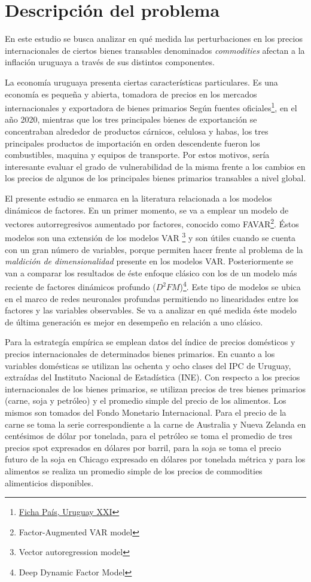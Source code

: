 \chapter{Descripción del problema}\label{chap:intro}

En este estudio se busca analizar en qué medida las perturbaciones en los precios internacionales de ciertos bienes transables denominados \textit{commodities} afectan a la inflación uruguaya a través de sus distintos componentes. 

La economía uruguaya presenta ciertas características particulares. Es una economía es pequeña y abierta, tomadora de precios en los mercados internacionales y exportadora de bienes primarios  Según fuentes oficiales\footnote{\href{https://fichapais.uruguayxxi.gub.uy/}{Ficha País, Uruguay XXI}}, en el año 2020, mientras que los tres principales bienes de exportanción se concentraban alrededor de productos cárnicos, celulosa y habas, los tres principales productos de importación en orden descendente fueron los combustibles, maquina y equipos de transporte. Por estos motivos,  sería interesante evaluar el grado de vulnerabilidad de la misma frente a los cambios en los precios de algunos de los principales bienes primarios transables a nivel global.


El presente estudio se enmarca en la literatura relacionada a los modelos dinámicos de factores. En un primer momento, se va a emplear un modelo de vectores autorregresivos aumentado por factores, conocido como FAVAR\footnote{Factor-Augmented VAR model}. Éstos modelos son una extensión de los modelos VAR \footnote{ Vector autoregression model} 
y son útiles cuando se cuenta con un gran número de variables, porque permiten hacer frente al problema de la \textit{maldición de dimensionalidad} presente en los modelos VAR. Posteriormente se van a comparar los resultados de éste enfoque clásico con los de un modelo más reciente de factores dinámicos profundo ($D^2FM$)\footnote{Deep Dynamic Factor Model}. Este tipo de modelos se ubica en el marco de redes neuronales profundas permitiendo no linearidades entre los factores y las variables observables. Se va a analizar en qué medida éste modelo de última generación es mejor en desempeño en relación a uno clásico.

Para la estrategía empírica se emplean datos del índice de precios domésticos y precios internacionales de determinados bienes primarios. En cuanto a los variables domésticas se utilizan las ochenta y ocho clases del IPC de Uruguay, extraídas del Instituto Nacional de Estadística (INE).  Con respecto a los precios internacionales de los bienes primarios, se utilizan precios de tres bienes primarios (carne, soja y petróleo) y el promedio simple del precio de los alimentos. Los mismos son tomados del Fondo Monetario Internacional. Para el precio de la carne se toma la serie correspondiente a la carne de Australia y Nueva Zelanda en centésimos de dólar por tonelada, para el petróleo se toma el promedio de tres precios spot expresados en dólares por barril, para la soja
se toma el precio futuro de la soja en Chicago expresado en dólares por tonelada
métrica  y para los alimentos se realiza un promedio simple de los precios de commodities alimenticios disponibles. 